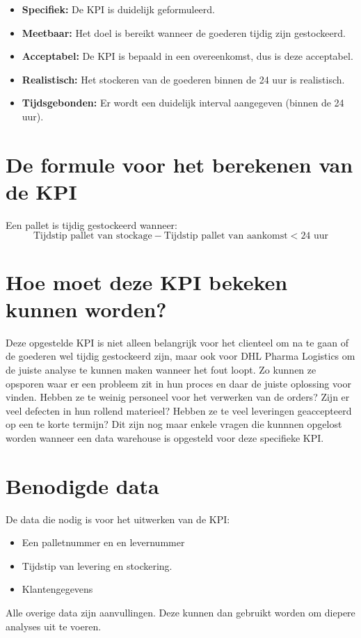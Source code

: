 \begin{itemize}
	\item \textbf{Specifiek: } De KPI is duidelijk geformuleerd.
	\item \textbf{Meetbaar: } Het doel is bereikt wanneer de goederen tijdig zijn gestockeerd.
	\item \textbf{Acceptabel:} De KPI is bepaald in een overeenkomst, dus is deze acceptabel.
	\item \textbf{Realistisch: } Het stockeren van de goederen binnen de 24 uur is realistisch.
	\item \textbf{Tijdsgebonden: } Er wordt een duidelijk interval aangegeven (binnen de 24 uur).
\end{itemize} 

\section{De formule voor het berekenen van de KPI}
Een pallet is tijdig gestockeerd wanneer:
\begin{equation*}
	\text{Tijdstip pallet van stockage} - \text{Tijdstip pallet van aankomst} < \text{24 uur}
\end{equation*}

\section{Hoe moet deze KPI bekeken kunnen worden?}
Deze opgestelde KPI is niet alleen belangrijk voor het clienteel om na te gaan of de goederen wel tijdig gestockeerd zijn, maar ook voor DHL Pharma Logistics om de juiste analyse te kunnen maken wanneer het fout loopt. Zo kunnen ze opsporen waar er een probleem zit in hun proces en daar de juiste oplossing voor vinden. Hebben ze te weinig personeel voor het verwerken van de orders? Zijn er veel defecten in hun rollend materieel? Hebben ze te veel leveringen geaccepteerd op een te korte termijn? Dit zijn nog maar enkele vragen die kunnnen opgelost worden wanneer een data warehouse is opgesteld voor deze specifieke KPI.

\section{Benodigde data}
De data die nodig is voor het uitwerken van de KPI:
\begin{itemize}
	\item Een palletnummer en en levernummer
	\item Tijdstip van levering en stockering.
	\item Klantengegevens
\end{itemize} 

Alle overige data zijn aanvullingen. Deze kunnen dan gebruikt worden om diepere analyses uit te voeren.